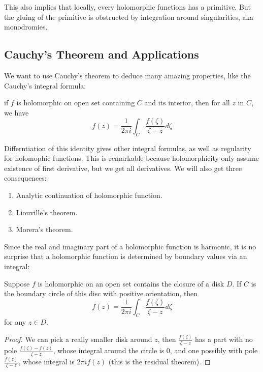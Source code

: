 \documentclass[main.tex]{subfiles}
\begin{document}
This also implies that locally, every holomorphic functions has a primitive. But the gluing of the primitive is obstructed by integration around singularities, aka monodromies.

\subsection{Cauchy's Theorem and Applications}
We want to use Cauchy's theorem to deduce many amazing properties, like the Cauchy's integral formula:

\begin{theorem}
if $f$ is holomorphic on open set containing $C$ and its interior, then for all $z$ in $C$, we have 
$$
f(z) = \frac{1}{2\pi i} \int_C \frac{f(\zeta)}{\zeta - z} d\zeta
$$
\end{theorem}

Differntiation of this identity gives other integral formulas, as well as regularity for holomophic functions. This is remarkable because holomorphicity only assume existence of first derivative, but we get all derivatives. We will also get three consequences:

\begin{enumerate}
    \item Analytic continuation of holomorphic function. 
    \item Liouville's theorem.
    \item Morera's theorem.
\end{enumerate}

Since the real and imaginary part of a holomorphic function is harmonic, it is no surprise that a holomorphic function is determined by boundary values via an integral:

\begin{theorem}
Suppose $f$ is holomorphic on an open set contains the closure of a disk $D$. If $C$ is the boundary circle of this disc with positive orientation, then
$$
f(z) = \frac{1}{2\pi i} \int_C \frac{f(\zeta)}{\zeta - z} d\zeta
$$
for any $z \in D$.
\end{theorem}

\begin{proof}
We can pick a really smaller disk around $z$, then $\frac{f(\zeta)}{\zeta - z}$ has a part with no pole $\frac{f(\zeta) - f(z)}{\zeta - z}$, whose integral around the circle is $0$, and one possibly with pole $\frac{f(z)}{\zeta - z}$, whose integral is $2\pi i f(z)$ (this is the residual theorem).
\end{proof}
\end{document}
